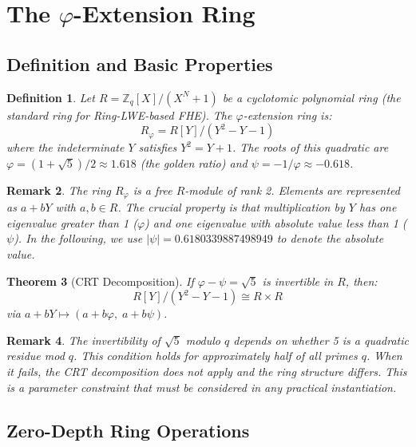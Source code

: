 \documentclass[11pt,a4paper]{article}
\newtheorem{theorem}{Theorem}[section]
\newtheorem{definition}[theorem]{Definition}
\newtheorem{remark}[theorem]{Remark}
\begin{document}
\section{The $\varphi$-Extension Ring}

\subsection{Definition and Basic Properties}

\begin{definition}
Let $R = \mathbb{Z}_q[X]/(X^N+1)$ be a cyclotomic polynomial ring (the standard ring for Ring-LWE-based FHE). The $\varphi$-extension ring is:
\begin{equation}
R_\varphi = R[Y]/(Y^2-Y-1)
\end{equation}
where the indeterminate $Y$ satisfies $Y^2 = Y+1$. The roots of this quadratic are $\varphi = (1+\sqrt{5})/2 \approx 1.618$ (the golden ratio) and $\psi = -1/\varphi \approx -0.618$.
\end{definition}

\begin{remark}
The ring $R_\varphi$ is a free $R$-module of rank 2. Elements are represented as $a + bY$ with $a,b \in R$. The crucial property is that multiplication by $Y$ has one eigenvalue greater than 1 ($\varphi$) and one eigenvalue with absolute value less than 1 ($\psi$). In the following, we use $|\psi| = 0.6180339887498949$ to denote the absolute value.
\end{remark}

\begin{theorem}[CRT Decomposition]
If $\varphi - \psi = \sqrt{5}$ is invertible in $R$, then:
\begin{equation}
R[Y]/(Y^2-Y-1) \cong R \times R
\end{equation}
via $a + bY \mapsto (a + b\varphi,\; a + b\psi)$.
\end{theorem}

\begin{remark}
The invertibility of $\sqrt{5}$ modulo $q$ depends on whether 5 is a quadratic residue mod $q$. This condition holds for approximately half of all primes $q$. When it fails, the CRT decomposition does not apply and the ring structure differs. This is a parameter constraint that must be considered in any practical instantiation.
\end{remark}

\subsection{Zero-Depth Ring Operations}
\end{document}
